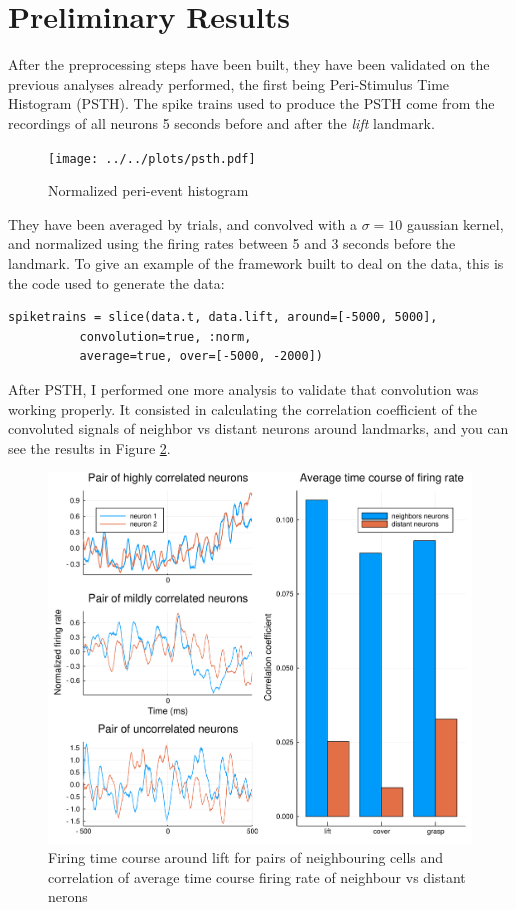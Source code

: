 \section{Preliminary Results}

After the preprocessing steps have been built, they have been validated on the previous analyses already performed, the first being Peri-Stimulus Time Histogram (PSTH). The spike trains used to produce the PSTH come from the recordings of all neurons 5 seconds before and after the \emph{lift} landmark. 
\begin{figure}[h!]
	\centering
	\texttt{[image: ../../plots/psth.pdf]}
	\caption{Normalized peri-event histogram}
	\label{fig:psth}
\end{figure}
They have been averaged by trials, and convolved with a $\sigma=10$ gaussian kernel, and normalized using the firing rates between 5 and 3 seconds before the landmark. To give an example of the framework built to deal on the data, this is the code used to generate the data:
\bigskip 
\begin{lstlisting}[]
spiketrains = slice(data.t, data.lift, around=[-5000, 5000], 
		  convolution=true, :norm, 
		  average=true, over=[-5000, -2000])
\end{lstlisting}
\bigskip
After PSTH, I performed one more analysis to validate that convolution was working properly. It consisted in calculating the correlation coefficient of the convoluted signals of neighbor vs distant neurons around landmarks, and you can see the results in Figure \ref{fig:corr-coeff}.

\begin{figure}[h!]
	\centering
	\includegraphics[scale=0.5]{../../plots/corr-coef.pdf}
	\caption{Firing time course around lift for pairs of neighbouring cells and correlation of average time course firing rate of neighbour vs distant nerons}
	\label{fig:corr-coeff}
\end{figure}

